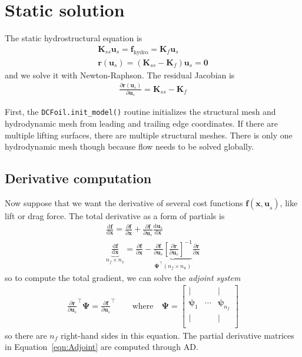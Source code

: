 \documentclass[10pt]{article}
\newcommand{\pp}[2]{\frac{\partial #1}{\partial #2}}
\newcommand{\dd}[2]{\frac{\textrm{d} #1}{\textrm{d} #2}}
\newcommand{\mbf}[1]{\mathbf{#1}}
\newcommand{\be}{\begin{eqnarray}}
\newcommand{\ee}{\end{eqnarray}}
\newcommand{\tn}[1]{\textrm{#1}}
\begin{document}
\onecolumn
\clearpage
\section{Static solution}
The static hydrostructural equation is
\be
\mbf{K}_{ss} \mbf{u}_s   = \mbf{f}_{\tn{hydro}} = \mbf{K}_f \mbf{u}_s
\\
\mbf{r}(\mbf{u}_s) = \left(\mbf{K}_{ss} - \mbf{K}_f\right)\mbf{u}_s  = \mbf{0}
\ee
and we solve it with Newton-Raphson.
The residual Jacobian is
\be
\pp{\mbf{r}(\mbf{u}_s)}{\mbf{u}_s}
=
\mbf{K}_{ss} - \mbf{K}_{f}
\ee

First, the \texttt{DCFoil.init\_model()} routine initializes the structural mesh and hydrodynamic mesh from leading and trailing edge coordinates.
If there are multiple lifting surfaces, there are multiple structural meshes.
There is only one hydrodynamic mesh though because flow needs to be solved globally.

\subsection{Derivative computation}
% 
Now suppose that we want the derivative of several cost functions $\mbf{f}(\mbf{x,u}_s)$, like lift or drag force.
The total derivative as a form of partials \cite[Sec. 6.7.2]{Martins2022} is
\be
\dd{\mbf{f}}{\mbf{x}} =
\pp{\mbf{f}}{\mbf{x}} + \pp{\mbf{f}}{\mbf{u}_s} \dd{\mbf{u}_s}{\mbf{x}}
\\
\label{eqn:Adjoint}
\boxed{
    \underbrace{
        \dd{ \mbf{f}}{\mbf{x}}
    }_{n_f \times n_x}
    = \pp{\mbf{f}}{\mbf{x}}
    -
    \underbrace{\pp{\mbf{f}}{\mbf{u}_s} \left[\pp{\mbf{r}}{\mbf{u}_s}\right]^{-1}
    }_{\boldsymbol{\Psi^\top} (n_f \times n_u)}
    \pp{\mbf{r}}{\mbf{x}}
}
\ee
so to compute the total gradient, we can solve the \emph{adjoint system}
\be
\pp{\mbf{r}}{\mbf{u}_s}^\top \boldsymbol{\Psi}
=
\pp{\mbf{f}}{\mbf{u}_s}^\top
\qquad
\tn{where}
\quad
\boldsymbol{\Psi} = \begin{bmatrix}
    |                   &        & |                       \\
    \boldsymbol{\psi}_1 & \cdots & \boldsymbol{\psi}_{n_f} \\
    |                   &        & |                       \\
\end{bmatrix}
\ee
so there are $n_f$ right-hand sides in this equation.
The partial derivative matrices in Equation~\eqref{eqn:Adjoint} are computed through \ac{AD}.
\end{document}

